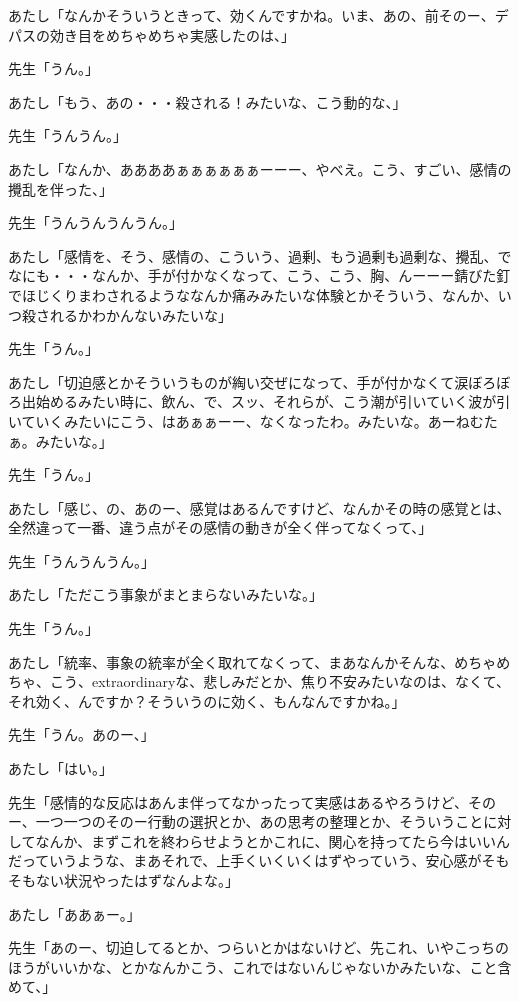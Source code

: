 \documentclass[b5j,twoside,twocolumn]{utarticle}
\begin{document}
\begin{description}
\item あたし「なんかそういうときって、効くんですかね。いま、あの、前そのー、デパスの効き目をめちゃめちゃ実感したのは、」
\item 先生「うん。」
\item あたし「もう、あの・・・殺される！みたいな、こう動的な、」
\item 先生「うんうん。」
\item あたし「なんか、ああああぁぁぁぁぁぁーーー、やべえ。こう、すごい、感情の攪乱を伴った、」
\item 先生「うんうんうんうん。」
\item あたし「感情を、そう、感情の、こういう、過剰、もう過剰も過剰な、攪乱、でなにも・・・なんか、手が付かなくなって、こう、こう、胸、んーーー錆びた釘でほじくりまわされるようななんか痛みみたいな体験とかそういう、なんか、いつ殺されるかわかんないみたいな」
\item 先生「うん。」
\item あたし「切迫感とかそういうものが綯い交ぜになって、手が付かなくて涙ぼろぼろ出始めるみたい時に、飲ん、で、スッ、それらが、こう潮が引いていく波が引いていくみたいにこう、はあぁぁーー、なくなったわ。みたいな。あーねむたぁ。みたいな。」
\item 先生「うん。」
\item あたし「感じ、の、あのー、感覚はあるんですけど、なんかその時の感覚とは、全然違って一番、違う点がその感情の動きが全く伴ってなくって、」
\item 先生「うんうんうん。」
\item あたし「ただこう事象がまとまらないみたいな。」
\item 先生「うん。」
\item あたし「統率、事象の統率が全く取れてなくって、まあなんかそんな、めちゃめちゃ、こう、extraordinaryな、悲しみだとか、焦り不安みたいなのは、なくて、それ効く、んですか？そういうのに効く、もんなんですかね。」
\item 先生「うん。あのー、」
\item あたし「はい。」
\item 先生「感情的な反応はあんま伴ってなかったって実感はあるやろうけど、そのー、一つ一つのそのー行動の選択とか、あの思考の整理とか、そういうことに対してなんか、まずこれを終わらせようとかこれに、関心を持ってたら今はいいんだっていうような、まあそれで、上手くいくいくはずやっていう、安心感がそもそもない状況やったはずなんよな。」
\item あたし「ああぁー。」
\item 先生「あのー、切迫してるとか、つらいとかはないけど、先これ、いやこっちのほうがいいかな、とかなんかこう、これではないんじゃないかみたいな、こと含めて、」

\end{description}
\end{document}
